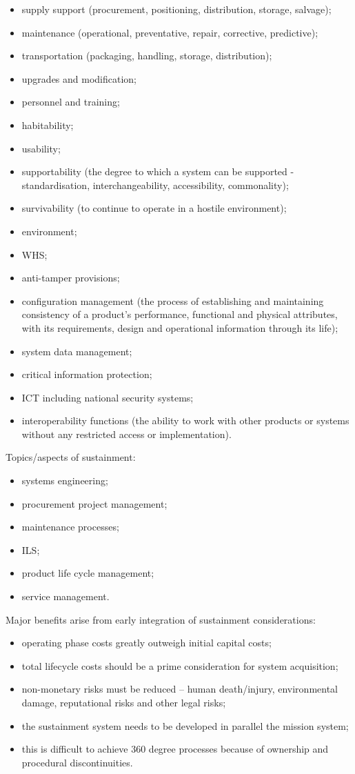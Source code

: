 \documentclass[journal]{IEEEtran}
\begin{document}
\begin{itemize}
	\item supply support (procurement, positioning, distribution, storage, salvage);
	\item maintenance (operational, preventative, repair, corrective, predictive);
	\item transportation (packaging, handling, storage, distribution);
	\item upgrades and modification;
	\item personnel and training;
	\item habitability;
	\item usability;
	\item supportability (the degree to which a system can be supported - standardisation, interchangeability, accessibility, commonality);
	\item survivability (to continue to operate in a hostile environment);
	\item environment;
	\item WHS;
	\item anti-tamper provisions;
	\item configuration management (the process of establishing and maintaining consistency of a product's performance, functional and physical attributes, with its requirements, design and operational information through its life);
	\item system data management;
	\item critical information protection;
	\item ICT including national security systems;
	\item interoperability functions (the ability to work with other products or systems without any restricted access or implementation).
\end{itemize}
Topics/aspects of sustainment:
\begin{itemize}
	\item systems engineering;
	\item procurement project management;
	\item maintenance processes;
	\item ILS;
	\item product life cycle management;
	\item service management.
\end{itemize}
Major benefits arise from early integration of sustainment considerations:
\begin{itemize}
	\item operating phase costs greatly outweigh initial capital costs;
	\item total lifecycle costs should be a prime consideration for system acquisition;
	\item non-monetary risks must be reduced -- human death/injury, environmental damage, reputational risks and other legal risks;
	\item the sustainment system needs to be developed in parallel the mission system;
	\item this is difficult to achieve 360 degree processes because of ownership and procedural discontinuities.
\end{itemize}
\end{document}
